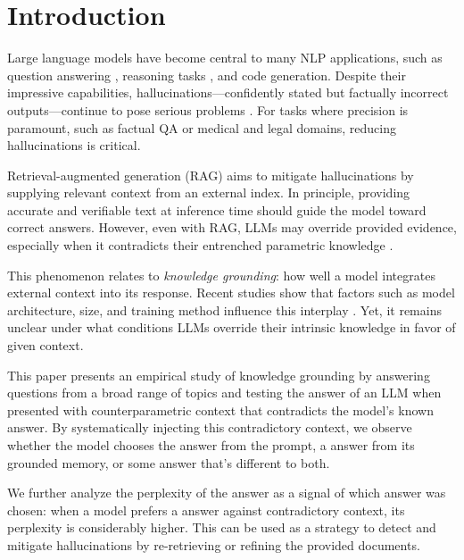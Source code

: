 \section{Introduction}

Large language models have become central to many NLP applications, such as question answering \citep{gpt3,how_can_we_know}, reasoning tasks \citep{treeofthoughts}, and code generation.
Despite their impressive capabilities, hallucinations—confidently stated but factually incorrect outputs—continue to pose serious problems \citep{how_can_we_know}.
For tasks where precision is paramount, such as factual QA or medical and legal domains, reducing hallucinations is critical.

Retrieval-augmented generation (RAG) \citep{rag} aims to mitigate hallucinations by supplying relevant context from an external index.
In principle, providing accurate and verifiable text at inference time should guide the model toward correct answers.
However, even with RAG, LLMs may override provided evidence, especially when it contradicts their entrenched parametric knowledge \citep{factual_recall,ragged}.

This phenomenon relates to \emph{knowledge grounding}: how well a model integrates external context into its response.
Recent studies show that factors such as model architecture, size, and training method influence this interplay \citep{factual_recall,flant5,llama}.
Yet, it remains unclear under what conditions LLMs override their intrinsic knowledge in favor of given context.

This paper presents an empirical study of knowledge grounding by answering questions from a broad range of topics and testing the answer of an LLM when presented with counterparametric context that contradicts the model's known answer.
By systematically injecting this contradictory context, we observe whether the model chooses the \Contextual{} answer from the prompt, a \Parametric{} answer from its grounded memory, or some \Other{} answer that's different to both.

We further analyze the perplexity of the answer as a signal of which answer was chosen: when a model prefers a \Parametric{} answer against contradictory context, its perplexity is considerably higher.
This can be used as a strategy to detect and mitigate hallucinations by re-retrieving or refining the provided documents.

